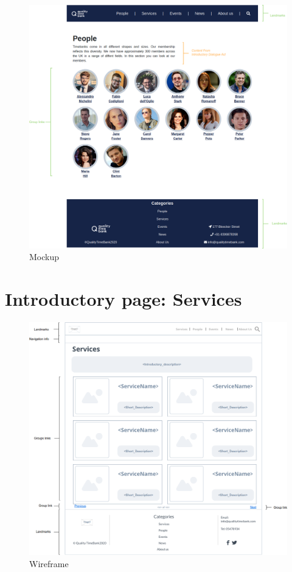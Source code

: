\documentclass[a4paper, 11pt, parskip=half, headsepline]{scrreprt}
\begin{document}
\begin{figure}[H]
    \centering
    \includegraphics[width=1\linewidth, keepaspectratio]{mockups/ConcretePeople}
    \caption{Mockup}
\end{figure}

\section{Introductory page: Services}

\begin{figure}[H]
    \centering
    \includegraphics[width=1\linewidth, keepaspectratio]{wireframes/Introductory-Services}
    \caption{Wireframe}
\end{figure}
\end{document}
